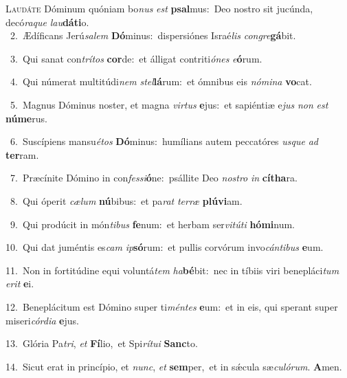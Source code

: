 \lettrine{\initial\textcolor{\initialcolor}{L}}{audáte} Dóminum quóniam bo\textit{nus} \textit{est} \textbf{psal}\-mus:~\star Deo nostro sit jucúnda, decó\-\textit{ra}\-\textit{que} \textit{lau}\-\textbf{dá}\textbf{ti}o.\\
{\numbfont\textcolor{\numbcolor}{~2.}}~Ædíficans Jerú\-\textit{sa}\-\textit{lem} \textbf{Dó}\-minus:~\star dispersiónes Israé\textit{lis} \textit{con}\-\textit{gre}\textbf{gá}bit.\par
{\numbfont\textcolor{\numbcolor}{~3.}}~Qui sanat con\-\textit{trí}\-\textit{tos} \textbf{cor}\-de:~\star et álligat contriti\-\textit{ó}\-\textit{nes} \textit{e}\-\textbf{ó}rum.\par
{\numbfont\textcolor{\numbcolor}{~4.}}~Qui númerat multitúdi\textit{nem} \textit{stel}\-\textbf{lá}rum:~\star et ómnibus eis \textit{nó}\-\textit{mi}\textit{na} \textbf{vo}\-cat.\par
{\numbfont\textcolor{\numbcolor}{~5.}}~Magnus Dóminus noster, et magna \textit{vir}\-\textit{tus} \textbf{e}\-jus:~\star et sapiéntiæ e\textit{jus} \textit{non} \textit{est} \textbf{nú}\-\textbf{me}rus.\par
{\numbfont\textcolor{\numbcolor}{~6.}}~Suscípiens mansu\-\textit{é}\-\textit{tos} \textbf{Dó}\-minus:~\star humílians autem peccatóres \textit{us}\-\textit{que} \textit{ad} \textbf{ter}\-ram.\par
{\numbfont\textcolor{\numbcolor}{~7.}}~Præcínite Dómino in con\-\textit{fes}\-\textit{si}\textbf{ó}ne:~\star psállite Deo \textit{nos}\-\textit{tro} \textit{in} \textbf{cí}\-\textbf{tha}ra.\par
{\numbfont\textcolor{\numbcolor}{~8.}}~Qui óperit \textit{cæ}\-\textit{lum} \textbf{nú}\-bibus:~\star et pa\textit{rat} \textit{ter}\-\textit{ræ} \textbf{plú}\-\textbf{vi}am.\par
{\numbfont\textcolor{\numbcolor}{~9.}}~Qui prodúcit in món\-\textit{ti}\-\textit{bus} \textbf{fe}\-num:~\star et herbam ser\-\textit{vi}\-\textit{tú}\textit{ti} \textbf{hó}\-\textbf{mi}num.\par
{\numbfont\textcolor{\numbcolor}{10.}}~Qui dat juméntis es\textit{cam} \textit{ip}\-\textbf{só}rum:~\star et pullis corvórum invo\-\textit{cán}\-\textit{ti}\textit{bus} \textbf{e}\-um.\par
{\numbfont\textcolor{\numbcolor}{11.}}~Non in fortitúdine equi voluntá\textit{tem} \textit{ha}\-\textbf{bé}bit:~\star nec in tíbiis viri benepláci\textit{tum} \textit{e}\-\textit{rit} \textbf{e}\-i.\par
{\numbfont\textcolor{\numbcolor}{12.}}~Beneplácitum est Dómino super ti\-\textit{mén}\-\textit{tes} \textbf{e}\-um:~\star et in eis, qui sperant super miseri\-\textit{cór}\-\textit{di}\textit{a} \textbf{e}\-jus.\par
{\numbfont\textcolor{\numbcolor}{13.}}~Glória Pa\-\textit{tri}\-, \textit{et} \textbf{Fí}\-lio,~\star et Spi\-\textit{rí}\-\textit{tu}\textit{i} \textbf{Sanc}\-to.\par
{\numbfont\textcolor{\numbcolor}{14.}}~Sicut erat in princípio, et \textit{nunc}\-, \textit{et} \textbf{sem}\-per,~\star et in sǽcula sæ\-\textit{cu}\-\textit{ló}\textit{rum}. \textbf{A}\-men.\par

